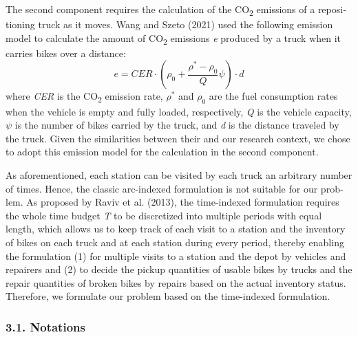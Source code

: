 \documentclass[
  english,
]{article}
\begin{document}
\begin{otherlanguage}{english}
\protect{}\label{p0190}
The second component requires the calculation of the CO\textsubscript{2} emissions of a
repositioning truck as it moves. Wang and Szeto (2021) used the following emission model to
calculate the amount of CO\textsubscript{2} emissions \emph{e} produced by a truck when it carries
bikes over a
distance:\[\tag{1}e = CER \cdot \left( {\rho_{0} + \frac{\rho^{\ast} - \rho_{0}}{Q}\psi} \right) \cdot d\]where
\emph{CER} is the CO\textsubscript{2} emission rate, \(\rho^{\ast}\) and \(\rho_{0}\) are the fuel
consumption rates when the vehicle is empty and fully loaded, respectively, \emph{Q} is the vehicle
capacity, \(\psi\) is the number of bikes carried by the truck, and \emph{d} is the distance
traveled by the truck. Given the similarities between their and our research context, we chose to
adopt this emission model for the calculation in the second component.

\protect{}\label{p0195}
As aforementioned, each station can be visited by each truck an arbitrary number of times. Hence,
the classic arc-indexed formulation is not suitable for our problem. As proposed by Raviv et al.
(2013), the time-indexed formulation requires the whole time budget \emph{T} to be discretized into
multiple periods with equal length, which allows us to keep track of each visit to a station and the
inventory of bikes on each truck and at each station during every period, thereby enabling the
formulation (1) for multiple visits to a station and the depot by vehicles and repairers and (2) to
decide the pickup quantities of usable bikes by trucks and the repair quantities of broken bikes by
repairs based on the actual inventory status. Therefore, we formulate our problem based on the
time-indexed formulation.

\protect{}\label{s0035}
\subsubsection{3.1. Notations}\label{st055}


\end{otherlanguage}
\end{document}
